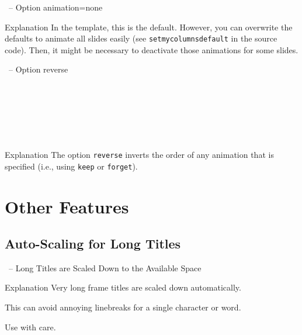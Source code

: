 \documentclass[
	aspectratio=169, %
	8pt, %
]{beamer}
\begin{document}
{\begin{frame}{\insertsubsection\ -- Option animation=none}
\begin{note}{Explanation}
		In the template, this is the default. However, you can overwrite the defaults to animate all slides easily (see \texttt{setmycolumnsdefault} in the source code). Then, it might be necessary to deactivate those animations for some slides.
	\end{note}
\end{frame}

\begin{frame}[label=current]{\insertsubsection\ -- Option reverse}
	\begin{mycolumns}[columns=4,forget,reverse,b]
		\\[0mm]~
	\mynextcolumn
		\\[5mm]~
	\mynextcolumn
		\\[10mm]~
	\mynextcolumn
		\\[15mm]~
	\end{mycolumns}
	\begin{note}{Explanation}
		The option \texttt{reverse} inverts the order of any animation that is specified (i.e., using \texttt{keep} or \texttt{forget}).
	\end{note}
\end{frame}

\section{Other Features}

\subsection{Auto-Scaling for Long Titles}
\begin{frame}{\insertsubsection\ -- Long Titles are Scaled Down to the Available Space}
	\begin{note}{Explanation}
		Very long frame titles are scaled down automatically.

		\hfill\hfill\hfill This can avoid annoying linebreaks for a single character or word.\hfill~

		\hfill Use with care.
	\end{note}
\end{frame}

}
\end{document}
